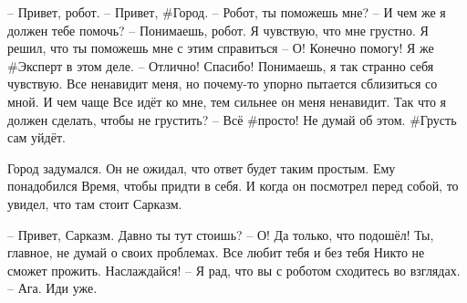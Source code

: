 – Привет, робот.
– Привет, #Город.
– Робот, ты поможешь мне?
– И чем же я должен тебе помочь?
– Понимаешь, робот. Я чувствую, что мне грустно. Я решил, что ты поможешь мне с этим справиться
– О! Конечно помогу! Я же #Эксперт в этом деле.
– Отлично! Спасибо! Понимаешь, я так странно себя чувствую. Все ненавидит меня, но почему-то упорно пытается сблизиться со мной. И чем чаще Все идёт ко мне, тем сильнее он меня ненавидит. Так что я должен сделать, чтобы не грустить?
– Всё #просто! Не думай об этом. #Грусть сам уйдёт.

Город задумался. Он не ожидал, что ответ будет таким простым. Ему понадобился Время, чтобы придти в себя. И когда он посмотрел перед собой, то увидел, что там стоит Сарказм.

– Привет, Сарказм. Давно ты тут стоишь?
– О! Да только, что подошёл! Ты, главное, не думай о своих проблемах. Все любит тебя и без тебя Никто не сможет прожить. Наслаждайся!
– Я рад, что вы с роботом сходитесь во взглядах.
– Ага. Иди уже.